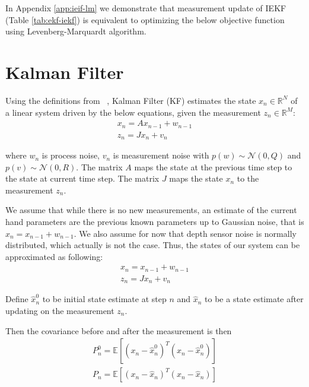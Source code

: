 \documentclass[10pt,twocolumn,letterpaper]{article}
\begin{document}
In Appendix \ref{app:ieif-lm} we demonstrate that measurement update of IEKF (Table \ref{tab:ekf-iekf}) is equivalent to optimizing the below objective function using Levenberg-Marquardt algorithm.


\appendix

\section{Kalman Filter} \label{app:kalman}

Using the definitions from ~\cite{welch1995introduction}, Kalman Filter (KF) estimates the state $x_n \in \mathbb{R}^N$ of a linear system driven by the below equations, given the measurement $z_n \in \mathbb{R}^M$:
\begin{align}
x_n = A x_{n - 1} +  w_{n - 1} \\
z_n = J x_n + v_n
\end{align}

where $w_n$ is process noise, $v_n$ is measurement noise with $p(w) \sim \mathcal{N}(0, Q)$ and $p(v) \sim \mathcal{N}(0, R)$. 
The matrix $A$ maps the state at the previous time step to the state at current time step. The matrix $J$ maps the state $x_n$ to the measurement $z_n$.

We assume that while  there is no new measurements, an estimate of the current hand parameters are the previous known parameters up to Gaussian noise, that is $x_n = x_{n-1} + w_{n-1}$. We also assume for now that depth sensor noise is normally distributed, which actually is not the case. Thus, the states of our system can be approximated as following:
\begin{align}
x_n = x_{n - 1} + w_{n - 1} \\
z_n = J x_n + v_n
\end{align}

Define $\hat{x}_n^0$ to be initial state estimate at step $n$ and $\hat{x}_n$ to be a state estimate after updating on the measurement $z_n$.

Then the covariance before and after the measurement is then 
\begin{align}
P_n^0=\mathbb{E}[(x_n - \hat{x}_n^0)^T(x_n - \hat{x}_n^0)]\\
P_n =\mathbb{E}[(x_n - \hat{x}_n)^T(x_n - \hat{x}_n)]
\end{align}
\end{document}
